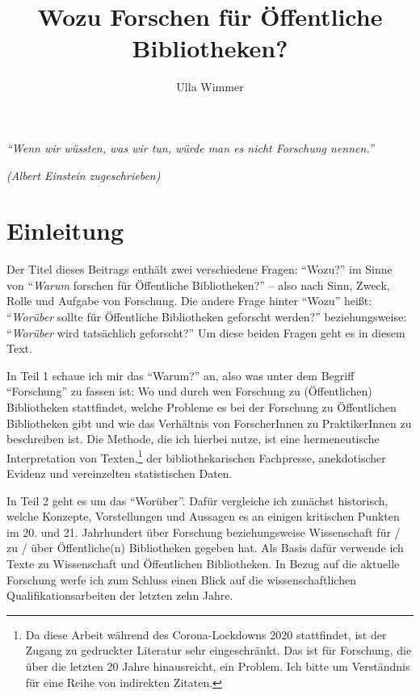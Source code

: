 \documentclass[a4paper,
fontsize=11pt,
oneside,
numbers=noperiodatend,
parskip=half-,
bibliography=totoc,
final
]{scrartcl}
\title{\LARGE{Wozu Forschen für Öffentliche Bibliotheken?}}%
\author{Ulla Wimmer} %
\date{}
\begin{document}
\maketitle
\thispagestyle{fancyplain} 


\begin{flushright}
\emph{\enquote{Wenn wir wüssten, was wir tun, würde man es nicht
Forschung nennen.}}

\emph{(Albert Einstein zugeschrieben)}
\end{flushright}

\hypertarget{einleitung}{%
\section{Einleitung}\label{einleitung}}

Der Titel dieses Beitrags enthält zwei verschiedene Fragen:
\enquote{Wozu?} im Sinne von \enquote{\emph{Warum} forschen für
Öffentliche Bibliotheken?} -- also nach Sinn, Zweck, Rolle und Aufgabe
von Forschung. Die andere Frage hinter \enquote{Wozu} heißt:
\enquote{\emph{Worüber} sollte für Öffentliche Bibliotheken geforscht
werden?} beziehungsweise: \enquote{\emph{Worüber} wird tatsächlich
geforscht?} Um diese beiden Fragen geht es in diesem Text.

In Teil 1 schaue ich mir das \enquote{Warum?} an, also was unter dem
Begriff \enquote{Forschung} zu fassen ist: Wo und durch wen Forschung zu
(Öffentlichen) Bibliotheken stattfindet, welche Probleme es bei der
Forschung zu Öffentlichen Bibliotheken gibt und wie das Verhältnis von
ForscherInnen zu PraktikerInnen zu beschreiben ist. Die Methode, die ich
hierbei nutze, ist eine hermeneutische Interpretation von
Texten,\footnote{Da diese Arbeit während des Corona-Lockdowns 2020
  stattfindet, ist der Zugang zu gedruckter Literatur sehr
  eingeschränkt. Das ist für Forschung, die über die letzten 20 Jahre
  hinausreicht, ein Problem. Ich bitte um Verständnis für eine Reihe von
  indirekten Zitaten.} der bibliothekarischen Fachpresse, anekdotischer
Evidenz und vereinzelten statistischen Daten.

In Teil 2 geht es um das \enquote{Worüber}. Dafür vergleiche ich
zunächst historisch, welche Konzepte, Vorstellungen und Aussagen es an
einigen kritischen Punkten im 20. und 21. Jahrhundert über Forschung
beziehungsweise Wissenschaft für / zu / über Öffentliche(n) Bibliotheken
gegeben hat. Als Basis dafür verwende ich Texte zu Wissenschaft und
Öffentlichen Bibliotheken. In Bezug auf die aktuelle Forschung werfe ich
zum Schluss einen Blick auf die wissenschaftlichen
Qualifikationsarbeiten der letzten zehn Jahre.
\end{document}
